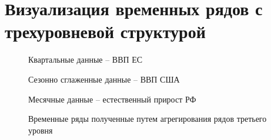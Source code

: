 \documentclass[12pt,a4paper, oneside]{extreport}
\begin{document}
\chapter[Визуализация временных рядов с трехуровневой структурой]{Визуализация временных рядов с трехуровневой структурой}\label{app-a}
\begin{figure}[H]
	\caption{Временные ряды полученные путем агрегирования рядов третьего уровня }
	\label{otkl_1}

	\centering\footnotesize{Квартальные данные -- ВВП ЕС }
		
	\begin{minipage}[H]{0.4\linewidth}
	\end{minipage}
	\begin{minipage}[H]{0.4\linewidth}
	\end{minipage}


	\centering\footnotesize{Сезонно сглаженные данные -- ВВП США}
	
	\begin{minipage}[H]{0.4\linewidth}
	\end{minipage}
\begin{minipage}[H]{0.4\linewidth}
\end{minipage}


	\centering\footnotesize{Месячные данные -- естественный прирост РФ  }
	
	\begin{minipage}[H]{0.4\linewidth}
	\end{minipage}
\begin{minipage}[H]{0.4\linewidth}
\end{minipage}
\end{figure}
\newpage
\end{document}
